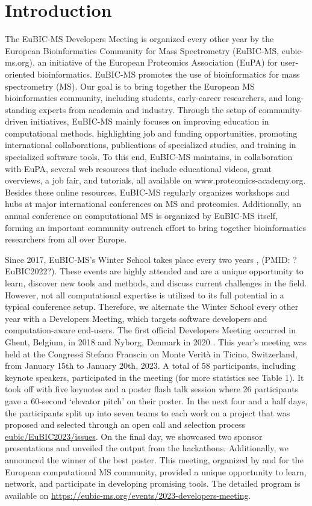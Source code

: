 \section{Introduction}
The EuBIC-MS Developers Meeting is organized every other year by the European Bioinformatics Community for Mass Spectrometry (EuBIC-MS, eubic-ms.org), an initiative of the European Proteomics Association (EuPA) for user-oriented bioinformatics. EuBIC-MS promotes the use of bioinformatics for mass spectrometry (MS). Our goal is to bring together the European MS bioinformatics community, including students, early-career researchers, and long-standing experts from academia and industry. Through the setup of community-driven initiatives, EuBIC-MS mainly focuses on improving education in computational methods, highlighting job and funding opportunities, promoting international collaborations, publications of specialized studies, and training in specialized software tools. To this end, EuBIC-MS maintains, in collaboration with EuPA, several web resources that include educational videos, grant overviews, a job fair, and tutorials, all available on www.proteomics-academy.org. Besides these online resources, EuBIC-MS regularly organizes workshops and hubs at major international conferences on MS and proteomics. Additionally, an annual conference on computational MS is organized by EuBIC-MS itself, forming an important community outreach effort to bring together bioinformatics researchers from all over Europe.

Since 2017, EuBIC-MS's Winter School takes place every two years \citep{pmid28385664}, (PMID: ?EuBIC2022?). These events are highly attended and are a unique opportunity to learn, discover new tools and methods, and discuss current challenges in the field. However, not all computational expertise is utilized to its full potential in a typical conference setup. Therefore, we alternate the Winter School every other year with a Developers Meeting, which targets software developers and computation-aware end-users. The first official Developers Meeting occurred in Ghent, Belgium, in 2018 \citep{pmid29864591} and Nyborg, Denmark in 2020 \citep{EuBIC-MS2020}. This year's meeting was held at the Congressi Stefano Franscin on Monte Verità in Ticino, Switzerland, from January 15th to January 20th, 2023. A total of 58 participants, including keynote speakers, participated in the meeting (for more statistics see Table 1).  It took off with five keynotes and a poster flash talk session where 26 participants gave a 60-second `elevator pitch' on their poster. In the next four and a half days, the participants split up into seven teams to each work on a project that was proposed and selected through an open call and selection process \href{https://github.com/eubic/EuBIC2023/issues}{eubic/EuBIC2023/issues}. On the final day, we showcased two sponsor presentations and unveiled the output from the hackathons. Additionally, we announced the winner of the best poster. This meeting, organized by and for the European computational MS community, provided a unique opportunity to learn, network, and participate in developing promising tools. The detailed program is available on \url{https://eubic-ms.org/events/2023-developers-meeting}.
